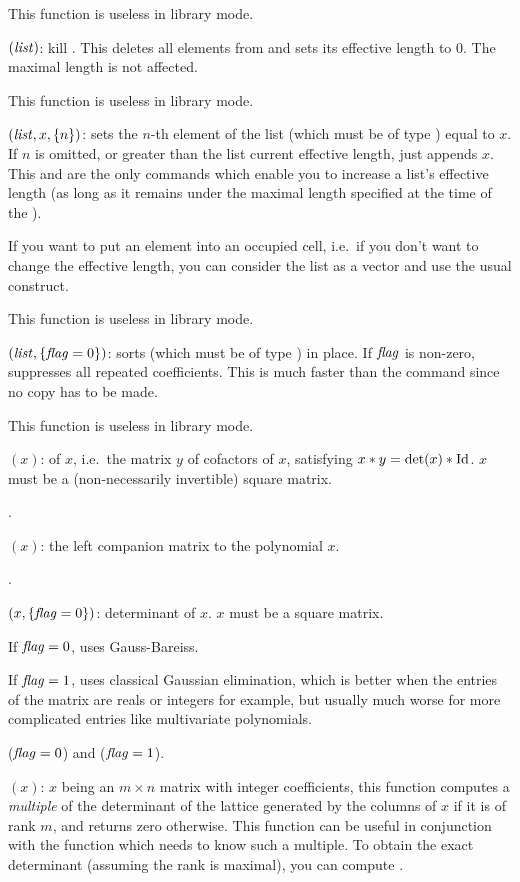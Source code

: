 This function is useless in library mode.

$(\hbox{\it list\/})$: kill . This deletes all
elements from  and sets its effective length to $0$. The maximal
length is not affected.

This function is useless in library mode.

$(\hbox{\it list\/},x,\{n\})$: sets the $n$-th element of the list
 (which must be of type ) equal to $x$. If $n$ is omitted,
or greater than the list current effective length, just appends $x$. This and
 are the only commands which enable you to increase a list's
effective length (as long as it remains under the maximal length specified at
the time of the ).

If you want to put an element into an occupied cell, i.e.~if you don't want to
change the effective length, you can consider the list as a vector and use
the usual  construct.

This function is useless in library mode.

$(\hbox{\it list\/},\{\hbox{\it f\kern0pt lag\/}=0\})$: sorts  (which must
be of type ) in place. If $\hbox{\it f\kern0pt lag\/}$ is non-zero, suppresses all repeated
coefficients. This is much faster than the  command since no
copy has to be made.

This function is useless in library mode.

$(x)$:  of $x$, i.e.~the matrix $y$
of cofactors of $x$, satisfying $x*y=\det(x)*{\rm Id}$. $x$ must be a
(non-necessarily invertible) square matrix.

.

$(x)$: the left companion matrix to the polynomial $x$.

.

$(x,\{\hbox{\it f\kern0pt lag\/}=0\})$: determinant of $x$. $x$ must be a
square matrix.

If $\hbox{\it f\kern0pt lag\/}=0$, uses Gauss-Bareiss.

If $\hbox{\it f\kern0pt lag\/}=1$, uses classical Gaussian elimination, which is better when the
entries of the matrix are reals or integers for example, but usually much
worse for more complicated entries like multivariate polynomials.

 ($\hbox{\it f\kern0pt lag\/}=0$) and  ($\hbox{\it f\kern0pt lag\/}=1$).

$(x)$: $x$ being an $m\times n$ matrix with integer
coefficients, this function computes a \emph{multiple} of the determinant of the
lattice generated by the columns of $x$ if it is of rank $m$, and returns
zero otherwise. This function can be useful in conjunction with the function
 which needs to know such a multiple. To obtain the
exact determinant (assuming the rank is maximal), you can compute
.

